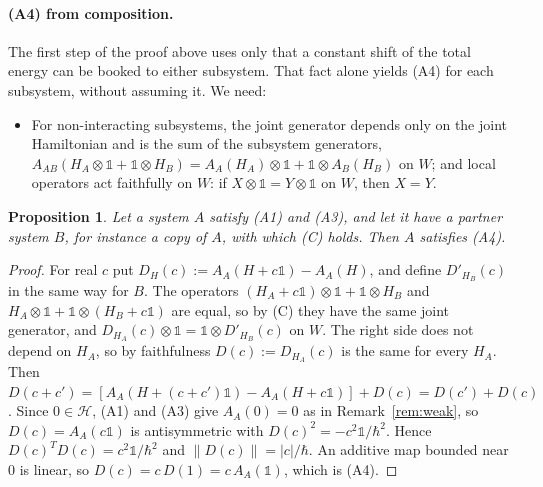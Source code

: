 \documentclass[11pt]{article}
\newtheorem{proposition}[theorem]{Proposition}
\theoremstyle{remark}
\newcommand{\one}{\mathbb{1}}
\begin{document}
\paragraph{(A4) from composition.} The first step of the proof above uses only that a constant shift of the total energy can be booked to either subsystem. That fact alone yields (A4) for each subsystem, without assuming it. We need:
\begin{itemize}
\item[(C)] For non-interacting subsystems, the joint generator depends only on the joint Hamiltonian and is the sum of the subsystem generators, $A_{AB}(H_A\otimes\one+\one\otimes H_B)=A_A(H_A)\otimes\one+\one\otimes A_B(H_B)$ on $W$; and local operators act faithfully on $W$: if $X\otimes\one=Y\otimes\one$ on $W$, then $X=Y$.
\end{itemize}

\begin{proposition}\label{prop:shift}
Let a system $A$ satisfy (A1) and (A3), and let it have a partner system $B$, for instance a copy of $A$, with which (C) holds. Then $A$ satisfies (A4).
\end{proposition}

\begin{proof}
For real $c$ put $D_{H}(c):=A_A(H+c\one)-A_A(H)$, and define $D'_{H_B}(c)$ in the same way for $B$. The operators $(H_A+c\one)\otimes\one+\one\otimes H_B$ and $H_A\otimes\one+\one\otimes(H_B+c\one)$ are equal, so by (C) they have the same joint generator, and $D_{H_A}(c)\otimes\one=\one\otimes D'_{H_B}(c)$ on $W$. The right side does not depend on $H_A$, so by faithfulness $D(c):=D_{H_A}(c)$ is the same for every $H_A$. Then $D(c+c')=[A_A(H+(c+c')\one)-A_A(H+c\one)]+D(c)=D(c')+D(c)$. Since $0\in\mathcal{H}$, (A1) and (A3) give $A_A(0)=0$ as in Remark~\ref{rem:weak}, so $D(c)=A_A(c\one)$ is antisymmetric with $D(c)^2=-c^2\one/\hbar^2$. Hence $D(c)^TD(c)=c^2\one/\hbar^2$ and $\|D(c)\|=|c|/\hbar$. An additive map bounded near $0$ is linear, so $D(c)=c\,D(1)=c\,A_A(\one)$, which is (A4).
\end{proof}
\end{document}
